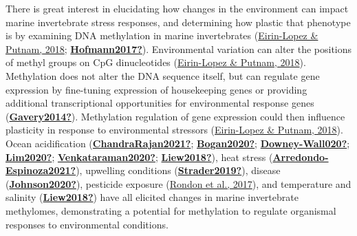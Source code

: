 \documentclass [11pt, proquest] {uwthesis}[2015/03/03]
\begin{document}
There is great interest in elucidating how changes in the environment can impact marine invertebrate stress responses, and determining how plastic that phenotype is by examining DNA methylation in marine invertebrates (\protect\hyperlink{ref-Eirin-Lopez2018}{Eirin-Lopez \& Putnam, 2018}; \protect\hyperlink{ref-Hofmann2017}{\textbf{Hofmann2017?}}). Environmental variation can alter the positions of methyl groups on CpG dinucleotides (\protect\hyperlink{ref-Eirin-Lopez2018}{Eirin-Lopez \& Putnam, 2018}). Methylation does not alter the DNA sequence itself, but can regulate gene expression by fine-tuning expression of housekeeping genes or providing additional transcriptional opportunities for environmental response genes (\protect\hyperlink{ref-Gavery2014}{\textbf{Gavery2014?}}). Methylation regulation of gene expression could then influence plasticity in response to environmental stressors (\protect\hyperlink{ref-Eirin-Lopez2018}{Eirin-Lopez \& Putnam, 2018}). Ocean acidification (\protect\hyperlink{ref-ChandraRajan2021}{\textbf{ChandraRajan2021?}}; \protect\hyperlink{ref-Bogan2020}{\textbf{Bogan2020?}}; \protect\hyperlink{ref-Downey-Wall020}{\textbf{Downey-Wall020?}}; \protect\hyperlink{ref-Lim2020}{\textbf{Lim2020?}}; \protect\hyperlink{ref-Venkataraman2020}{\textbf{Venkataraman2020?}}; \protect\hyperlink{ref-Liew2018}{\textbf{Liew2018?}}), heat stress (\protect\hyperlink{ref-Arredondo-Espinoza2021}{\textbf{Arredondo-Espinoza2021?}}), upwelling conditions (\protect\hyperlink{ref-Strader2019}{\textbf{Strader2019?}}), disease (\protect\hyperlink{ref-Johnson2020}{\textbf{Johnson2020?}}), pesticide exposure (\protect\hyperlink{ref-Rondon2017}{Rondon et al., 2017}), and temperature and salinity (\protect\hyperlink{ref-Liew2018}{\textbf{Liew2018?}}) have all elicited changes in marine invertebrate methylomes, demonstrating a potential for methylation to regulate organismal responses to environmental conditions.
\end{document}
